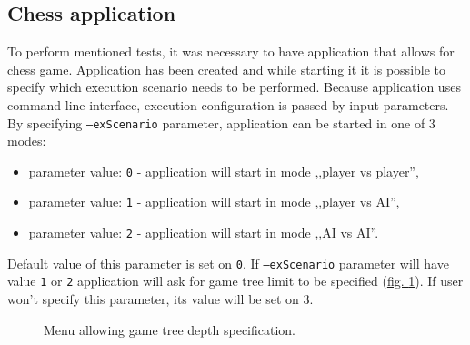 \subsection{Chess application}
To perform mentioned tests, it was necessary to have application that allows for chess game. Application has been created and while starting it it is possible to specify which execution scenario needs to be performed. Because application uses command line interface, execution configuration is passed by input parameters. By specifying \texttt{--exScenario} parameter, application can be started in one of 3 modes:
\begin{itemize}
    \item parameter value: \texttt{0} - application will start in mode ,,player vs player'',
    \item parameter value: \texttt{1} - application will start in mode ,,player vs AI'',
    \item parameter value: \texttt{2} - application will start in mode ,,AI vs AI''.
\end{itemize}
Default value of this parameter is set on \texttt{0}. If \texttt{--exScenario} parameter will have value \texttt{1} or \texttt{2} application will ask for game tree limit to be specified (\hyperref[fig:setting-game-tree-depth]{fig. \ref*{fig:setting-game-tree-depth}}). If user won't specify this parameter, its value will be set on $3$.
\begin{figure}
    \centering
    \begin{mdframed}
    \end{mdframed}
    \caption{Menu allowing game tree depth specification.}
    \label{fig:setting-game-tree-depth}
\end{figure}


